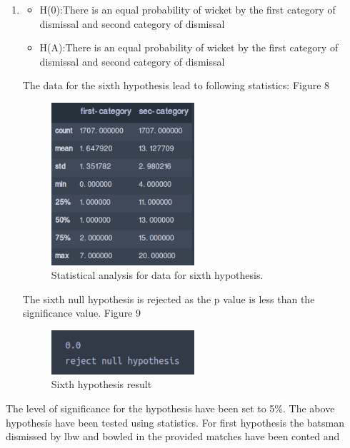\documentclass[fleqn,10pt]{wlscirep}
\begin{document}
\begin{enumerate}
\item
\begin{itemize}
    \item H(0):There is an equal probability of wicket by the first category of dismissal and second category of dismissal
    \item H(A):There is an equal probability of wicket by the first category of dismissal and second category of dismissal
\end{itemize}
 
The data for the sixth hypothesis lead to following statistics: Figure 8
  
\begin{figure}[h!]
    \centering
    \includegraphics[width=0.5\textwidth]{third.png}
    \caption{Statistical analysis for data for sixth hypothesis.}
  \end{figure}

  The sixth null hypothesis is rejected as the p value is less than the significance value. Figure 9
\begin{figure}[h!]
    \centering
    \includegraphics[width=0.5\textwidth]{thirdone.png}
    \caption{Sixth hypothesis result}
  \end{figure}

\end{enumerate}
The level of significance for the hypothesis have been set to 5\%.
The above hypothesis have been tested using statistics.\newline
For first hypothesis the batsman dismissed by lbw and bowled in the provided matches have been conted and 
\end{document}
